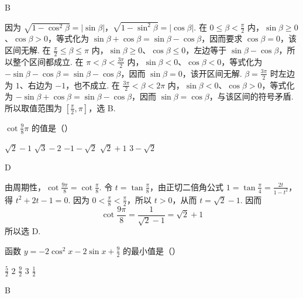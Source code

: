 \begin{answer}
B
\end{answer}

\begin{solution}
因为
\(\sqrt{1-\cos^2\beta}=|\sin\beta|\)，\(\sqrt{1-\sin^2\beta}=|\cos\beta|\).
在 \(0\leq\beta<\frac{\pi}{2}\) 内，\(\sin\beta\geq0\)、\(\cos\beta>0\)，等式化为 \(\sin\beta+\cos\beta=\sin\beta-\cos\beta\)，因而要求 \(\cos\beta=0\)，该区间无解. 在 \(\frac{\pi}{2}\leq\beta\leq\pi\) 内，\(\sin\beta\geq0\)、\(\cos\beta\leq0\)，左边等于 \(\sin\beta-\cos\beta\)，所以整个区间都成立. 在 \(\pi<\beta<\frac{3\pi}{2}\) 内，\(\sin\beta<0\)、\(\cos\beta<0\)，等式化为 \(-\sin\beta-\cos\beta=\sin\beta-\cos\beta\)，因而 \(\sin\beta=0\)，该开区间无解. \(\beta=\frac{3\pi}{2}\) 时左边为 \(1\)、右边为 \(-1\)，也不成立. 在 \(\frac{3\pi}{2}<\beta<2\pi\) 内，\(\sin\beta<0\)、\(\cos\beta>0\)，等式化为 \(-\sin\beta+\cos\beta=\sin\beta-\cos\beta\)，因而 \(\sin\beta=\cos\beta\)，与该区间的符号矛盾. 所以取值范围为 \([\frac{\pi}{2},\pi]\)，选 B.
\end{solution}


\begin{problem}

\(\cot \frac{9}{8} \pi\) 的值是（\quad）

\choicesfive
    {\(\sqrt{2} - 1\)}
    {\(\sqrt{3} - 2\)}
    {\(-1 - \sqrt{2}\)}
    {\(\sqrt{2} + 1\)}
    {\(3 - \sqrt{2}\)}
\end{problem}

\begin{answer}
D
\end{answer}

\begin{solution}
由周期性，\(\cot\frac{9\pi}{8}=\cot\frac{\pi}{8}\). 令 \(t=\tan\frac{\pi}{8}\)，由正切二倍角公式 \(1=\tan\frac{\pi}{4}=\frac{2t}{1-t^2}\)，得 \(t^2+2t-1=0\). 因为 \(0<\frac{\pi}{8}<\frac{\pi}{2}\)，所以 \(t>0\)，从而 \(t=\sqrt{2}-1\). 因而
\[
\cot\frac{9\pi}{8}=\frac{1}{\sqrt{2}-1}=\sqrt{2}+1
\]
所以选 D.
\end{solution}


\begin{problem}

函数 \(y = -2\cos^2 x - 2\sin x + \frac{9}{2} \) 的最小值是（\quad）

\choicesfive
    {\(\frac{5}{2}\)}
    {\(2\)}
    {\(\frac{9}{2}\)}
    {\(3\)}
    {\(\frac{1}{2} \)}
\end{problem}

\begin{answer}
B
\end{answer}

